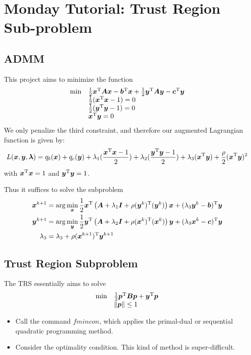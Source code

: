\section{Monday Tutorial: Trust Region Sub-problem}
\subsection{ADMM}
This project aims to minimize the function
\begin{equation}
\begin{array}{ll}
\min&\frac{1}{2}\bm x^{\mathrm T}\bm A\bm x-\bm b^{\mathrm T}\bm x+\frac{1}{2}\bm y^{\mathrm T}\bm A\bm y-\bm c^{\mathrm T}\bm y\\
&\frac{1}{2}(\bm x^{\mathrm T}\bm x-1)=0\\
&\frac{1}{2}(\bm y^{\mathrm T}\bm y-1)=0\\
&\bm x^{\mathrm T}\bm y=0
\end{array}
\end{equation}
We only penalize the third constraint, and therefore our augmented Lagrangian function is given by:
\[
L(\bm x,\bm y,\bm\lambda)=q_b(\bm x)+q_c(\bm y)+\lambda_1(\frac{\bm x^{\mathrm T}\bm x-1}{2})+\lambda_2(\frac{\bm y^{\mathrm T}\bm y-1}{2})+\lambda_3(\bm x^{\mathrm T}\bm y)+\frac{\rho}{2}(\bm x^{\mathrm T}\bm y)^2
\]
with $\bm x^{\mathrm T}\bm x=1$ and $\bm y^{\mathrm T}\bm y=1$.

Thus it suffices to solve the subproblem
\begin{align*}
\bm x^{k+1}&=\arg\min_{\bm x}\frac{1}{2}\bm x^{\mathrm T}\left(
\bm A+\lambda_1\bm I+\rho(\bm y^k)^{\mathrm T}(\bm y^k)
\right)\bm x+(\lambda_3\bm y^k-\bm b)^{\mathrm T}\bm y\\
\bm y^{k+1}&=\arg\min_{\bm y}\frac{1}{2}\bm y^{\mathrm T}\left(
\bm A+\lambda_2\bm I+\rho(\bm x^k)^{\mathrm T}(\bm x^k)
\right)\bm y+(\lambda_3\bm x^k-\bm c)^{\mathrm T}\bm y\\
\lambda_3&=\lambda_3+\rho(\bm x^{k+1})^{\mathrm T}\bm y^{k+1}
\end{align*}
\subsection{Trust Region Subproblem}
The TRS essentially aims to solve
\[
\begin{array}{ll}
\min&\frac{1}{2}\bm p^{\mathrm T}\bm B\bm p+\bm y^{\mathrm T}\bm p\\
&\|\bm p\|\le1
\end{array}
\]
\begin{itemize}
\item
Call the command $fmincon$, which applies the primal-dual or sequential quadratic programming method.
\item
Consider the optimality condition. This kind of method is super-difficult.
\end{itemize}

